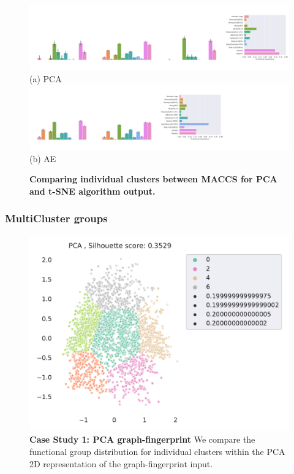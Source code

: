 \begin{landscape}
\begin{figure}[H]
    \centering
         \includegraphics[width=1.35\textheight]{./outputs/PCA/node2vec/group.png}
         \\ (a) PCA \\
     \hfill
            \includegraphics[width=1.35\textheight]{./outputs/AE/node2vec/group.png}
        \\ (b) AE
        \caption{ \textbf{Comparing individual clusters between MACCS for PCA and t-SNE algorithm output.} }
        \label{fig:biMACCS}
\end{figure}
\end{landscape}



\subsubsection{MultiCluster groups}







\begin{figure}[H]
    \centering
    \includegraphics[width=\textwidth]{outputs/PCA/fingerprints_all.pdf}
    \caption{\textbf{Case Study 1: PCA graph-fingerprint} We compare the functional group distribution for individual clusters within the PCA 2D representation of the graph-fingerprint input.}
    \label{fig:pcagraphcase}
\end{figure}


